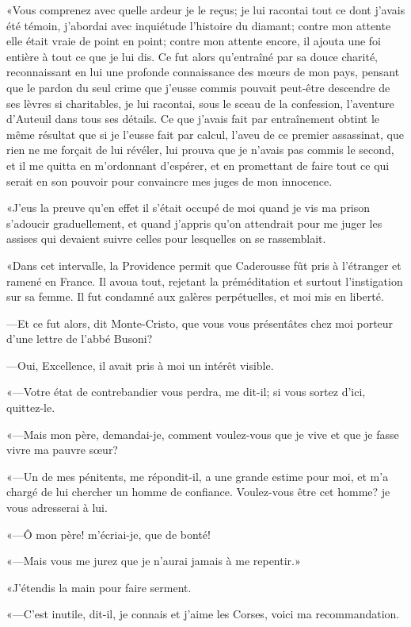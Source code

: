 «Vous comprenez avec quelle ardeur je le reçus; je lui racontai tout ce dont j'avais été témoin, j'abordai avec inquiétude l'histoire du diamant; contre mon attente elle était vraie de point en point; contre mon attente encore, il ajouta une foi entière à tout ce que je lui dis. Ce fut alors qu'entraîné par sa douce charité, reconnaissant en lui une profonde connaissance des mœurs de mon pays, pensant que le pardon du seul crime que j'eusse commis pouvait peut-être descendre de ses lèvres si charitables, je lui racontai, sous le sceau de la confession, l'aventure d'Auteuil dans tous ses détails. Ce que j'avais fait par entraînement obtint le même résultat que si je l'eusse fait par calcul, l'aveu de ce premier assassinat, que rien ne me forçait de lui révéler, lui prouva que je n'avais pas commis le second, et il me quitta en m'ordonnant d'espérer, et en promettant de faire tout ce qui serait en son pouvoir pour convaincre mes juges de mon innocence. 

«J'eus la preuve qu'en effet il s'était occupé de moi quand je vis ma prison s'adoucir graduellement, et quand j'appris qu'on attendrait pour me juger les assises qui devaient suivre celles pour lesquelles on se rassemblait. 

«Dans cet intervalle, la Providence permit que Caderousse fût pris à l'étranger et ramené en France. Il avoua tout, rejetant la préméditation et surtout l'instigation sur sa femme. Il fut condamné aux galères perpétuelles, et moi mis en liberté.  

—Et ce fut alors, dit Monte-Cristo, que vous vous présentâtes chez moi porteur d'une lettre de l'abbé Busoni? 

—Oui, Excellence, il avait pris à moi un intérêt visible. 

«—Votre état de contrebandier vous perdra, me dit-il; si vous sortez d'ici, quittez-le. 

«—Mais mon père, demandai-je, comment voulez-vous que je vive et que je fasse vivre ma pauvre sœur? 

«—Un de mes pénitents, me répondit-il, a une grande estime pour moi, et m'a chargé de lui chercher un homme de confiance. Voulez-vous être cet homme? je vous adresserai à lui. 

«—Ô mon père! m'écriai-je, que de bonté! 

«—Mais vous me jurez que je n'aurai jamais à me repentir.» 

«J'étendis la main pour faire serment. 

«—C'est inutile, dit-il, je connais et j'aime les Corses, voici ma recommandation. 

